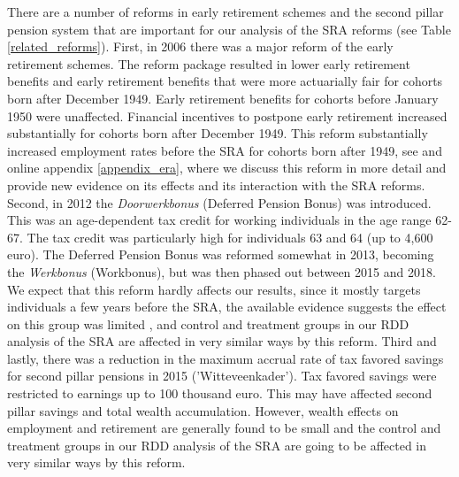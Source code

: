 \documentclass[12pt,a4paper]{article}
\begin{document}
There are a number of reforms in early retirement schemes and the second pillar pension system that are important for our analysis of the SRA reforms (see Table \ref{related_reforms}). First, in 2006 there was a major reform of the early retirement schemes.
The reform package resulted in lower early retirement benefits and early retirement benefits that were more actuarially fair for cohorts born after December 1949. Early retirement benefits for cohorts before January 1950 were unaffected.
Financial incentives to postpone early retirement increased substantially for cohorts born after December 1949. This reform substantially increased employment rates before the SRA for cohorts born after 1949, see \cite{lindeboom_montizaan_2020} and online appendix \ref{appendix_era}, where we discuss this reform in more detail and provide new evidence on its effects and its interaction with the SRA reforms. %
Second, in 2012 the \textit{Doorwerkbonus} (Deferred Pension Bonus) was introduced. This was an age-dependent tax credit for working individuals in the age range 62-67. The tax credit was particularly high for individuals 63 and 64 (up to 4,600 euro). The Deferred Pension Bonus was reformed somewhat in 2013, becoming the \textit{Werkbonus} (Workbonus), but was then phased out between 2015 and 2018. We expect that this reform hardly affects our results, since it mostly targets individuals a few years before the SRA, the available evidence suggests the effect on this group was limited \citep{CPB_2020_AOW}, and control and treatment groups in our RDD analysis of the SRA are affected in very similar ways by this reform. 
Third and lastly, there was a reduction in the maximum accrual rate of tax favored savings for second pillar pensions  in 2015 ('Witteveenkader'). Tax favored savings were restricted to earnings up to 100 thousand euro. This may have affected second pillar savings and total wealth accumulation. However, wealth effects on employment and retirement are generally found to be small \cite[see e.g.][]{van_erp_non-financial_2014} and the control and treatment groups in our RDD analysis of the SRA are going to be affected in very similar ways by this reform.
\end{document}
